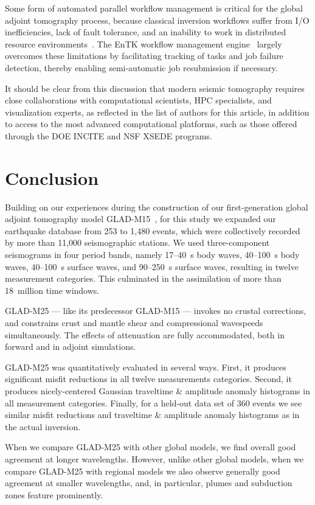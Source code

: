 \documentclass[extra,mreferee]{gji}
\begin{document}
Some form of automated parallel workflow management is critical for the global adjoint tomography process,
because classical inversion workflows suffer from I/O inefficiencies, lack of fault tolerance, and an inability to work in distributed resource environments~\citep{Lefebvre2018}.
The EnTK workflow management engine~\citep{EnTK2017}
largely overcomes these limitations by facilitating tracking of tasks and job failure detection,
thereby enabling semi-automatic job resubmission if necessary.

It should be clear from this discussion that modern seismic tomography requires close collaborations with computational scientists, HPC specialists, and visualization experts,
as reflected in the list of authors for this article, in addition to access to the most advanced computational platforms,
such as those offered through the DOE INCITE and NSF XSEDE programs.

\section{Conclusion}

Building on our experiences during the construction of our first-generation global adjoint tomography model GLAD-M15~\citep{bozdaug2016global},
for this study we expanded our earthquake database from 253 to 1,480 events,
which were collectively recorded by more than 11,000 seismographic stations.
We used three-component seismograms in four period bands,
namely 17--40~s body waves, 40--100~s body waves, 40--100~s surface waves, and 90--250~s surface waves,
resulting in twelve measurement categories.
This culminated in the assimilation of more than 18~million time windows.

GLAD-M25 --- like its predecessor GLAD-M15 --- invokes no crustal corrections,
and constrains crust and mantle shear and compressional wavespeeds simultaneously.
The effects of attenuation are fully accommodated,
both in forward and in adjoint simulations.

GLAD-M25 was quantitatively evaluated in several ways.
First, it produces significant misfit
reductions in all twelve measurements categories.
Second,
it produces nicely-centered Gaussian traveltime \& amplitude anomaly histograms
in all measurement categories.
Finally,
for a held-out data set of 360 events
we see similar misfit reductions and traveltime \& amplitude anomaly histograms as in the actual inversion.

When we compare GLAD-M25 with other global models,
we find overall good agreement at longer wavelengths.
However, unlike other global models, when we compare GLAD-M25 with regional models
we also observe generally good agreement at smaller wavelengths,
and, in particular, plumes and subduction zones feature prominently.
\end{document}
